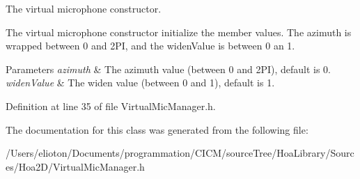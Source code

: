 The virtual microphone constructor. 

\begin{DoxyVerb}The virtual microphone constructor initialize the member values. The azimuth is wrapped between 0 and 2PI, and the widenValue is between 0 an 1.
\end{DoxyVerb}



\begin{DoxyParams}{Parameters}
{\em azimuth} & The azimuth value (between 0 and 2\-P\-I), default is 0. \\
\hline
{\em widen\-Value} & The widen value (between 0 and 1), default is 1. \\
\hline
\end{DoxyParams}


Definition at line 35 of file Virtual\-Mic\-Manager.\-h.



The documentation for this class was generated from the following file\-:\begin{DoxyCompactItemize}
\item 
/\-Users/elioton/\-Documents/programmation/\-C\-I\-C\-M/source\-Tree/\-Hoa\-Library/\-Sources/\-Hoa2\-D/Virtual\-Mic\-Manager.\-h\end{DoxyCompactItemize}
